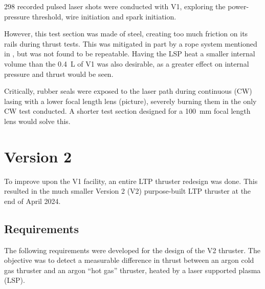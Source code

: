             298 recorded pulsed laser shots were conducted with V1, exploring the power-pressure threshold, wire initiation and spark initiation.

            However, this test section was made of steel, creating too much friction on its rails during thrust tests. This was mitigated in part by a rope system mentioned in \textcite{duplayArgonLaserPlasmaThruster2024a}, but was not found to be repeatable. Having the LSP heat a smaller internal volume than the \qty{0.4}{L} of V1 was also desirable, as a greater effect on internal pressure and thrust would be seen.

            Critically, rubber seals were exposed to the laser path during continuous (CW) lasing with a lower focal length lens (picture), severely burning them in the only CW test conducted. A shorter test section designed for a \qty{100}{mm} focal length lens would solve this.

    \section{Version 2} \label{sec:design_v2}

        To improve upon the V1 facility, an entire LTP thruster redesign was done. This resulted in the much smaller Version 2 (V2) purpose-built LTP thruster at the end of April 2024.

        \subsection{Requirements}

            The following requirements were developed for the design of the V2 thruster. The objective was to detect a measurable difference in thrust between an argon cold gas thruster and an argon “hot gas” thruster, heated by a laser supported plasma (LSP).

